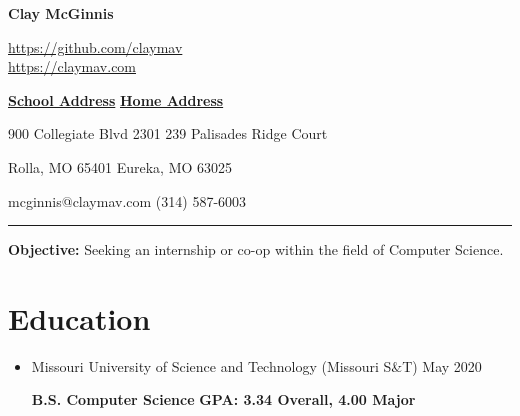 \documentclass[10pt,oneside]{article}
\makeatletter
\newcommand{\name}{Clay McGinnis}
\newcommand{\phone}{(314) 587-6003}
\newcommand{\email}{mcginnis@claymav.com}
\newcommand{\github}{https://github.com/claymav}
\newcommand{\website}{https://claymav.com}
\newcommand{\cgpa}{3.34}
\newcommand{\mgpa}{4.00}
\makeatother
\begin{document}
 \selectfont

\begin{center}
\textbf{\Huge{\name}}

\Large{\url{\github}}\\
\Large{\url{\website}}
\end{center}

\underline{\textbf{School Address}}
\hfill
\underline{\textbf{Home Address}}

900 Collegiate Blvd 2301
\hfill
239 Palisades Ridge Court

Rolla, MO 65401
\hfill
Eureka, MO 63025

\email
\hfill
\phone

\vspace{0pt} \rule{\textwidth}{1pt}

\vspace{4pt}
\textbf{Objective:} Seeking an internship or co-op within the field of Computer Science.
\vspace{4pt}

\vspace*{-17pt}
\section*{Education}
\vspace*{-5pt}

\begin{itemize}
	\item[] Missouri University of Science and Technology (Missouri S\&T)
			\hfill
			May 2020
			
    		\textbf{B.S. Computer Science}
			\hfill
			\textbf{GPA: \cgpa{} Overall, \mgpa{} Major}
    		\end{itemize}

\vspace*{-17pt}
\end{document}
